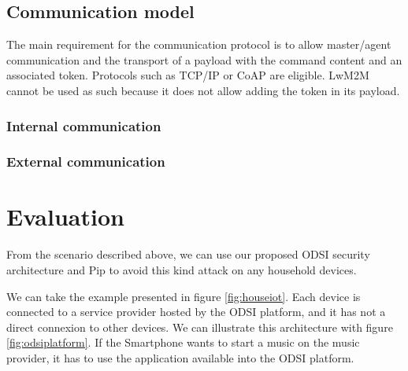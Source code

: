 \documentclass[conference]{IEEEtran}
\begin{document}
\subsection{Communication model}
\label{sec:Communication_model}
The main requirement for the communication protocol is to allow master/agent communication and the transport of a payload with the command content and an associated token. Protocols such as TCP/IP or CoAP are eligible. LwM2M \cite{oma_lwm2M_2017} cannot be used as such because it does not allow adding the token in its payload.

\subsubsection{Internal communication}

\subsubsection{External communication}


\section{Evaluation}

From the scenario described above\cite{Sivaraman2016}, we can use our proposed ODSI security architecture and Pip to avoid this kind attack on any household devices.

We can take the example presented in figure \ref{fig:houseiot}. Each device is connected to a service provider hosted by the ODSI platform, and it has not a direct connexion to other devices. We can illustrate this architecture with figure \ref{fig:odsiplatform}. If the Smartphone wants to start a music on the music provider, it has to use the application available into the ODSI platform.
\end{document}
